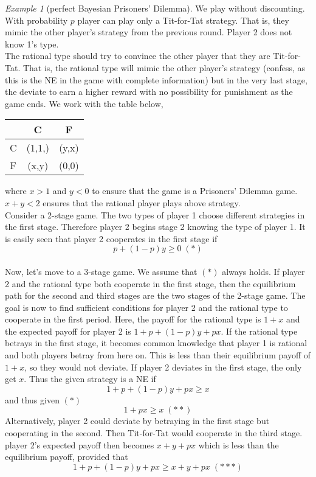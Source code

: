 \documentclass[a4paper, 12pt]{article}
\theoremstyle{plain}
\theoremstyle{definition}
\theoremstyle{lemma}
\theoremstyle{remark}
\theoremstyle{corollary}
\theoremstyle{example}
\newtheorem{example}[theorem]{Example}
\begin{document}
	\begin{example}[perfect Bayesian Prisoners' Dilemma]
		We play without discounting. With probability $p$ player can play only a Tit-for-Tat strategy. That is, they mimic the other player's strategy from the previous round. Player 2 does not know 1's type.\\
		The rational type should try to convince the other player that they are Tit-for-Tat. That is, the rational type will mimic the other player's strategy (confess, as this is the NE in the game with complete information) but in the very last stage, the deviate to earn a higher reward with no possibility for punishment as the game ends. We work with the table below,
		\begin{table}[h]
			\centering
			\begin{tabular}{|c|c|c|}
				\hline
				& C & F\\
				\hline
				C & (1,1,) & (y,x)\\
				\hline
				F & (x,y) & (0,0)\\
				\hline
			\end{tabular}
		\end{table}
		where $x>1$ and $y<0$ to ensure that the game is a Prisoners' Dilemma game. $x+y<2$ ensures that the rational player plays above strategy.\\
		Consider a 2-stage game. The two types of player 1 choose different strategies in the first stage. Therefore player 2 begins stage 2 knowing the type of player 1. It is easily seen that player 2 cooperates in the first stage if \[p+(1-p)y \geq 0 \; (*)\]\\
		Now, let's move to a 3-stage game. We assume that $(*)$ always holds. If player 2 and the rational type both cooperate in the first stage, then the equilibrium path for the second and third stages are the two stages of the 2-stage game. The goal is now to find sufficient conditions for player 2 and the rational type to cooperate in the first period. Here, the payoff for the rational type is $1+x$ and the expected payoff for player 2 is $1+p+(1-p)y +px$. If the rational type betrays in the first stage, it becomes common knowledge that player 1 is rational and both players betray from here on. This is less than their equilibrium payoff of $1+x$, so they would not deviate. If player 2 deviates in the first stage, the only get $x$. Thus the given strategy is a NE if \[1+p+(1-p)y +px \geq x\] and thus given $(*)$ \[1+px \geq x \; (**)\]
		Alternatively, player 2 could deviate by betraying in the first stage but cooperating in the second. Then Tit-for-Tat would cooperate in the third stage. player 2's expected payoff then becomes $x+y+px$ which is less than the equilibrium payoff, provided that \[1+p+(1-p)y +px \geq x+y+px\; (***)\]

\end{example}
\end{document}
